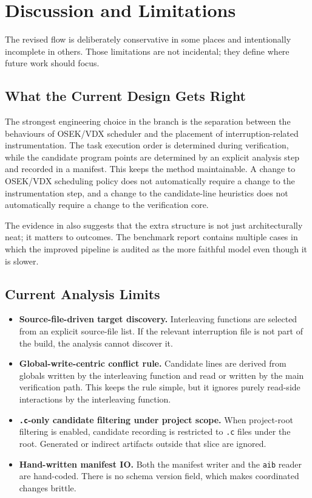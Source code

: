 \section{Discussion and Limitations}
\label{sec:discussion}

The revised flow is deliberately conservative in some places and intentionally incomplete in
others. Those limitations are not incidental; they define where future work should focus.

\subsection{What the Current Design Gets Right}

The strongest engineering choice in the branch is the separation between the behaviours of
OSEK/VDX scheduler and the placement of interruption-related instrumentation. The task
execution order is determined during verification, while the candidate program points are
determined by an explicit analysis step and recorded in a manifest. This keeps the method
maintainable. A change to OSEK/VDX scheduling policy does not automatically require a change
to the instrumentation step, and a change to the candidate-line heuristics does not
automatically require a change to the verification core.

The evidence in  also suggests that the extra structure is not just
architecturally neat; it matters to outcomes. The benchmark report contains multiple cases in
which the improved pipeline is audited as the more faithful model even though it is slower.

\subsection{Current Analysis Limits}

\begin{itemize}[leftmargin=1.5em]
  \item \textbf{Source-file-driven target discovery.} Interleaving functions are selected from
  an explicit source-file list. If the relevant interruption file is not part of the build, the
  analysis cannot discover it.
  \item \textbf{Global-write-centric conflict rule.} Candidate lines are derived from globals
  written by the interleaving function and read or written by the main verification path. This keeps
  the rule simple, but it ignores purely read-side interactions by the interleaving function.
  \item \textbf{\texttt{.c}-only candidate filtering under project scope.} When project-root
  filtering is enabled, candidate recording is restricted to \texttt{.c} files under the root.
  Generated or indirect artifacts outside that slice are ignored.
  \item \textbf{Hand-written manifest IO.} Both the manifest writer and the \texttt{aib}
  reader are hand-coded. There is no schema version field, which makes coordinated changes
  brittle.
\end{itemize}

